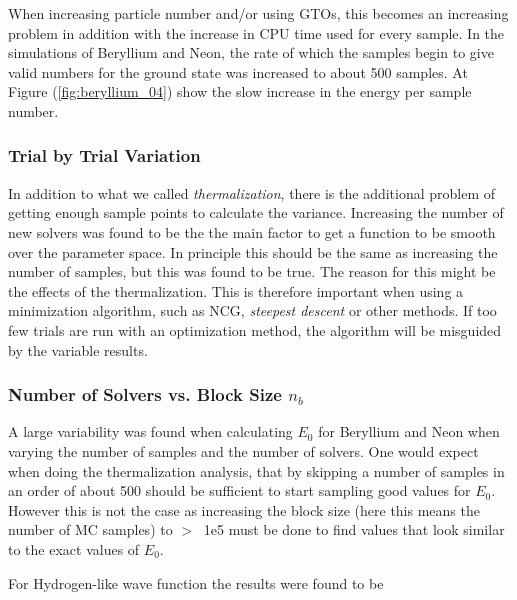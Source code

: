 \documentclass[twocolumns, a4paper,11pt,fleqn]{extarticle}
\begin{document}
When increasing particle number and/or using GTOs, this becomes an increasing problem
in addition with the increase in CPU time used for every sample. In the 
simulations of Beryllium and Neon, the rate of which the samples begin to give
valid numbers for the ground state was increased to about 500 samples. At 
Figure (\ref{fig:beryllium_04}) show the slow increase in the energy per sample number. 

\subsubsection{Trial by Trial Variation}
In addition to what we called \textit{thermalization}, 
there is the additional problem of getting 
enough sample points to calculate the variance. Increasing the number of new solvers 
was found to be the
the main factor to get a function to be smooth over the parameter space.
In principle this should be the same as increasing the number of samples,
but this was found to be true. The reason for this might be the effects of
the thermalization.
This is therefore
important when using a minimization algorithm, such as NCG, \textit{steepest descent}
or other methods. If too few trials are run with an optimization method, the 
algorithm will be misguided by the variable results.

\subsubsection{Number of Solvers vs. Block Size $n_b$}
A large variability was found when calculating $E_0$ for Beryllium and Neon when 
varying the number of samples and the number of solvers. One would expect
when doing the thermalization analysis, that by skipping a number of samples in
an order of about 500 should be sufficient to start sampling good values for $E_0$. 
However this is not the case as increasing the block size 
(here this means the number of MC samples) to $> \:$ 
1e5 must be done to find
values that look similar to the exact values of $E_0$.

For Hydrogen-like wave function the results were found to be
\end{document}
